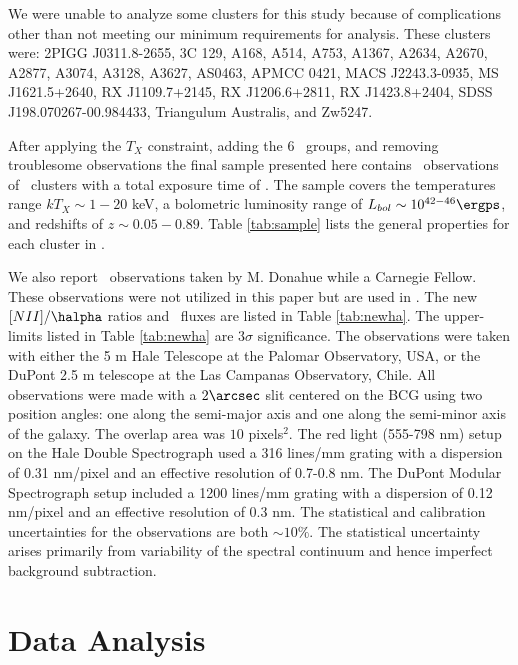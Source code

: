 \documentclass[apj]{emulateapj}
\begin{document}
We were unable to analyze some clusters for this study because of
complications other than not meeting our minimum requirements for
analysis. These clusters were: 2PIGG J0311.8-2655, 3C 129, A168, A514,
A753, A1367, A2634, A2670, A2877, A3074, A3128, A3627, AS0463, APMCC
0421, MACS J2243.3-0935, MS J1621.5+2640, RX J1109.7+2145, RX
J1206.6+2811, RX J1423.8+2404, SDSS J198.070267-00.984433, Triangulum
Australis, and Zw5247.

After applying the $T_X$ constraint, adding the 6 \hifl\ groups, and
removing troublesome observations the final sample presented here
contains \numobs\ observations of \numcluster\ clusters with a total
exposure time of \expt. The sample covers the temperatures range $kT_X
\sim 1-20$ keV, a bolometric luminosity range of $L_{bol} \sim
10^{42-46} \ergps$, and redshifts of $z \sim 0.05-0.89$. Table
\ref{tab:sample} lists the general properties for each cluster in
\accept.

We also report \halpha\ observations taken by M. Donahue while a
Carnegie Fellow. These observations were not utilized in this paper
but are used in \citet{haradent}. The new $[NII]/\halpha$ ratios and
\halpha\ fluxes are listed in Table \ref{tab:newha}. The upper-limits
listed in Table \ref{tab:newha} are $3\sigma$ significance. The
observations were taken with either the 5 m Hale Telescope at the
Palomar Observatory, USA, or the DuPont 2.5 m telescope at the Las
Campanas Observatory, Chile. All observations were made with a
$2\arcsec$ slit centered on the BCG using two position angles: one
along the semi-major axis and one along the semi-minor axis of the
galaxy. The overlap area was $10$ pixels$^2$. The red light (555-798
nm) setup on the Hale Double Spectrograph used a 316 lines/mm grating
with a dispersion of 0.31 nm/pixel and an effective resolution of
0.7-0.8 nm. The DuPont Modular Spectrograph setup included a 1200
lines/mm grating with a dispersion of 0.12 nm/pixel and an effective
resolution of 0.3 nm. The statistical and calibration uncertainties
for the observations are both $\sim 10\%$. The statistical uncertainty
arises primarily from variability of the spectral continuum and hence
imperfect background subtraction.

\section{Data Analysis}
\label{sec:data}
\end{document}
